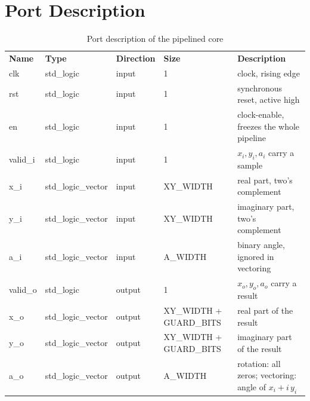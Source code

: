 \documentclass[a4paper, 12pt, notitlepage]{report}
\begin{document}
\section{Port Description}
\begin{table}[htbp]
   \center\small
   \begin{tabular}{@{}llllp{90pt}@{}}
      \rowcolor{tableheadcolor}\textbf{Name}& \textbf{Type} & \textbf{Direction} & \textbf{Size} & \textbf{Description} \\

      clk     & std\_logic         & input  & 1 & clock, rising edge \\\midrule
      rst     & std\_logic         & input  & 1 & synchronous reset, active high \\\midrule
      en      & std\_logic         & input  & 1 & clock-enable, freezes the whole pipeline \\\midrule
      valid\_i & std\_logic        & input  & 1 & $x_i, y_i, a_i$ carry a sample \\\midrule
      x\_i    & std\_logic\_vector & input  & XY\_WIDTH                & real part, two's complement \\\midrule
      y\_i    & std\_logic\_vector & input  & XY\_WIDTH                & imaginary part, two's complement \\\midrule
      a\_i    & std\_logic\_vector & input  & A\_WIDTH                 & binary angle, ignored in vectoring \\\midrule
      valid\_o & std\_logic        & output & 1 & $x_o, y_o, a_o$ carry a result \\\midrule
      x\_o    & std\_logic\_vector & output & XY\_WIDTH + GUARD\_BITS  & real part of the result \\\midrule
      y\_o    & std\_logic\_vector & output & XY\_WIDTH + GUARD\_BITS  & imaginary part of the result \\\midrule
      a\_o    & std\_logic\_vector & output & A\_WIDTH                 & rotation: all zeros; vectoring: angle of $x_i + i\,y_i$ \\
      \bottomrule
   \end{tabular}
   \caption{Port description of the pipelined core}
   \label{tab:pipe_ports}
\end{table}
\end{document}
